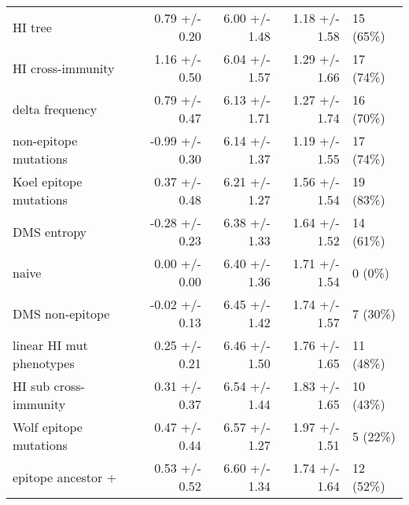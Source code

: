 \begin{tabular*}{1.0\textwidth}{lrrrl}
                           HI tree &   0.79 +/- 0.20 &                          6.00 +/- 1.48 &                                   1.18 +/- 1.58 &                               15 (65\%) \\
                 HI cross-immunity &   1.16 +/- 0.50 &                          6.04 +/- 1.57 &                                   1.29 +/- 1.66 &                               17 (74\%) \\
                   delta frequency &   0.79 +/- 0.47 &                          6.13 +/- 1.71 &                                   1.27 +/- 1.74 &                               16 (70\%) \\
             non-epitope mutations &  -0.99 +/- 0.30 &                          6.14 +/- 1.37 &                                   1.19 +/- 1.55 &                               17 (74\%) \\
            Koel epitope mutations &   0.37 +/- 0.48 &                          6.21 +/- 1.27 &                                   1.56 +/- 1.54 &                               19 (83\%) \\
                       DMS entropy &  -0.28 +/- 0.23 &                          6.38 +/- 1.33 &                                   1.64 +/- 1.52 &                               14 (61\%) \\
                             naive &   0.00 +/- 0.00 &                          6.40 +/- 1.36 &                                   1.71 +/- 1.54 &                                 0 (0\%) \\
                   DMS non-epitope &  -0.02 +/- 0.13 &                          6.45 +/- 1.42 &                                   1.74 +/- 1.57 &                                7 (30\%) \\
          linear HI mut phenotypes &   0.25 +/- 0.21 &                          6.46 +/- 1.50 &                                   1.76 +/- 1.65 &                               11 (48\%) \\
             HI sub cross-immunity &   0.31 +/- 0.37 &                          6.54 +/- 1.44 &                                   1.83 +/- 1.65 &                               10 (43\%) \\
            Wolf epitope mutations &   0.47 +/- 0.44 &                          6.57 +/- 1.27 &                                   1.97 +/- 1.51 &                                5 (22\%) \\
                epitope ancestor + &   0.53 +/- 0.52 &                          6.60 +/- 1.34 &                                   1.74 +/- 1.64 &                               12 (52\%) \\

\end{tabular*}
